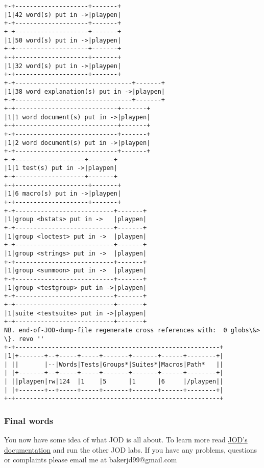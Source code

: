 \documentclass[11pt,letter,landscape]{article}
\begin{document}
    \begin{Verbatim}[commandchars=\\\{\}]
+-+--------------------+-------+
|1|42 word(s) put in ->|playpen|
+-+--------------------+-------+
+-+--------------------+-------+
|1|50 word(s) put in ->|playpen|
+-+--------------------+-------+
+-+--------------------+-------+
|1|32 word(s) put in ->|playpen|
+-+--------------------+-------+
+-+--------------------------------+-------+
|1|38 word explanation(s) put in ->|playpen|
+-+--------------------------------+-------+
+-+----------------------------+-------+
|1|1 word document(s) put in ->|playpen|
+-+----------------------------+-------+
+-+----------------------------+-------+
|1|2 word document(s) put in ->|playpen|
+-+----------------------------+-------+
+-+-------------------+-------+
|1|1 test(s) put in ->|playpen|
+-+-------------------+-------+
+-+--------------------+-------+
|1|6 macro(s) put in ->|playpen|
+-+--------------------+-------+
+-+---------------------------+-------+
|1|group <bstats> put in ->   |playpen|
+-+---------------------------+-------+
|1|group <loctest> put in ->  |playpen|
+-+---------------------------+-------+
|1|group <strings> put in ->  |playpen|
+-+---------------------------+-------+
|1|group <sunmoon> put in ->  |playpen|
+-+---------------------------+-------+
|1|group <testgroup> put in ->|playpen|
+-+---------------------------+-------+
+-+---------------------------+-------+
|1|suite <testsuite> put in ->|playpen|
+-+---------------------------+-------+
NB. end-of-JOD-dump-file regenerate cross references with:  0 globs\&> \}. revo '' 
+-+--------------------------------------------------------+
|1|+-------+--+-----+-----+-------+-------+------+--------+|
| ||       |--|Words|Tests|Groups*|Suites*|Macros|Path*   ||
| |+-------+--+-----+-----+-------+-------+------+--------+|
| ||playpen|rw|124  |1    |5      |1      |6     |/playpen||
| |+-------+--+-----+-----+-------+-------+------+--------+|
+-+--------------------------------------------------------+

    \end{Verbatim}

    \subsubsection{Final words}\label{final-words}

You now have some idea of what JOD is all about. To learn more read
\href{https://github.com/jsoftware/general_joddocument/blob/master/pdfdoc/jod.pdf}{JOD's
documentation} and run the other JOD labs. If you have any problems,
questions or complaints please email me at bakerjd99@gmail.com
\end{document}

